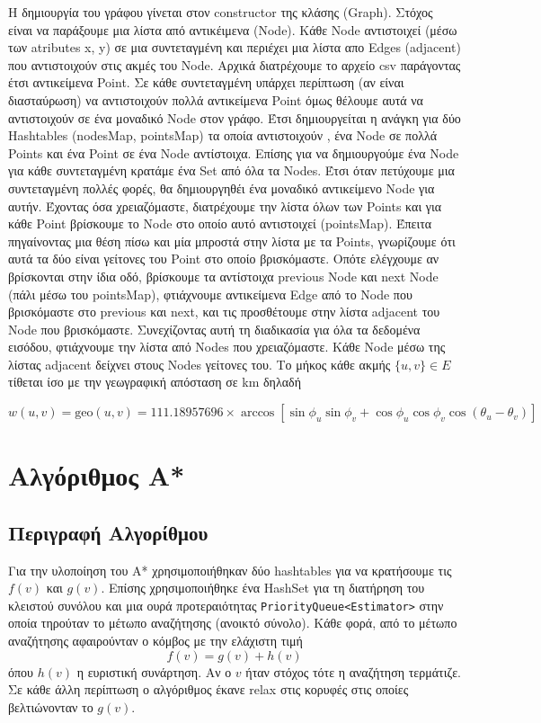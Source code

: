 \documentclass[a4paper,12pt]{article}
\begin{document}
Η δημιουργία του γράφου γίνεται στον constructor της κλάσης (Graph). Στόχος είναι να παράξουμε μια λίστα από αντικέιμενα (Node). Κάθε Node αντιστοιχεί (μέσω των atributes x, y) σε μια συντεταγμένη και περιέχει μια λίστα απο Edges (adjacent) που αντιστοιχούν στις ακμές του Node. Αρχικά διατρέχουμε το αρχείο csv παράγοντας έτσι αντικείμενα Point. Σε κάθε συντεταγμένη υπάρχει περίπτωση (αν είναι διασταύρωση) να αντιστοιχούν πολλά αντικείμενα Point όμως θέλουμε αυτά να αντιστοιχούν σε ένα μοναδικό Node στον γράφο. Έτσι δημιουργείται η ανάγκη για δύο Hashtables (nodesMap, pointsMap) τα οποία αντιστοιχούν , ένα Node σε πολλά Points και ένα Point σε ένα Node αντίστοιχα. Επίσης για να δημιουργούμε ένα Node για κάθε συντεταγμένη κρατάμε ένα Set από όλα τα Nodes. Έτσι όταν πετύχουμε μια συντεταγμένη πολλές φορές, θα δημιουργηθέι ένα μοναδικό αντικείμενο Node για αυτήν. Έχοντας όσα χρειαζόμαστε, διατρέχουμε την λίστα όλων των Points και για κάθε Point βρίσκουμε το Node στο οποίο αυτό αντιστοιχεί (pointsMap). Έπειτα πηγαίνοντας μια θέση πίσω και μία μπροστά στην λίστα με τα Points, γνωρίζουμε ότι αυτά τα δύο είναι γείτονες του Point στο οποίο βρισκόμαστε. Οπότε ελέγχουμε αν βρίσκονται στην ίδια οδό, βρίσκουμε τα αντίστοιχα previous Node και next Node (πάλι μέσω του pointsMap), φτιάχνουμε αντικείμενα Edge από το Node που βρισκόμαστε στο previous και next, και τις προσθέτουμε στην λίστα adjacent του Node που βρισκόμαστε. Συνεχίζοντας αυτή τη διαδικασία για όλα τα δεδομένα εισόδου, φτιάχνουμε την λίστα από Nodes που χρειαζόμαστε. Κάθε Node μέσω της λίστας adjacent δείχνει στους Nodes γείτονες του. Το μήκος κάθε ακμής $\{u, v\} \in E$ τίθεται ίσο με την γεωγραφική απόσταση σε km δηλαδή 

$$w(u, v) = \mathrm{geo}(u, v) = 111.18957696 \times \arccos \left [ \sin \phi_u \sin \phi_v + \cos \phi_u \cos \phi_v \cos (\theta_u - \theta_v) \right ]$$



\section{Αλγόριθμος Α*}

\subsection{Περιγραφή Αλγορίθμου}
Για την υλοποίηση του Α* χρησιμοποιήθηκαν δύο hashtables για να κρατήσουμε τις $f(v)$ και $g(v)$. Επίσης χρησιμοποιήθηκε ένα HashSet για τη διατήρηση του κλειστού συνόλου και μια ουρά προτεραιότητας \texttt{PriorityQueue<Estimator>} στην οποία τηρούταν το μέτωπο αναζήτησης (ανοικτό σύνολο). Κάθε φορά, από το μέτωπο αναζήτησης αφαιρούνταν ο κόμβος με την ελάχιστη τιμή $$f(v) = g(v) + h(v)$$ όπου $h(v)$ η ευριστική συνάρτηση. Αν ο $v$ ήταν στόχος τότε η αναζήτηση τερμάτιζε. Σε κάθε άλλη περίπτωση ο αλγόριθμος έκανε relax στις κορυφές στις οποίες βελτιώνονταν το $g(v)$. 
\end{document}
